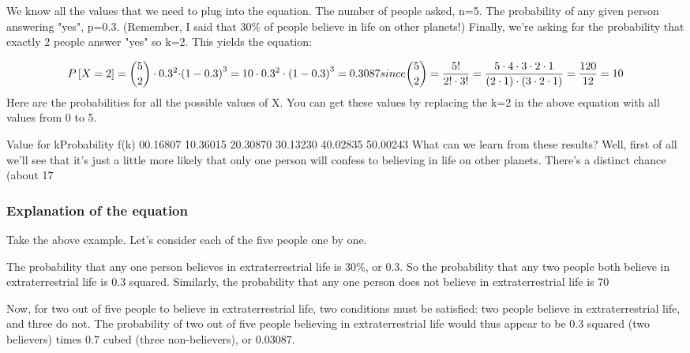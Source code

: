 We know all the values that we need to plug into the equation. The number of people asked, n=5. The probability of any given person answering "yes", p=0.3. (Remember, I said that 30\% of people believe in life on other planets!) Finally, we're asking for the probability that exactly 2 people answer "yes" so k=2. This yields the equation:

\[P \left[X = 2 \right] = {5 \choose 2} \cdot {{0.3^2 \cdot} {\left( 1 - 0.3 \right)^{3}}} = {10} \cdot {{0.3^2} \cdot {\left( 1-0.3 \right)^{3}}} = 0.3087 since {5 \choose 2}={5! \over 2! \cdot 3!}={5 \cdot 4 \cdot 3 \cdot 2 \cdot 1 \over (2 \cdot 1) \cdot (3 \cdot 2 \cdot 1)}={120 \over 12}=10\]
Here are the probabilities for all the possible values of X. You can get these values by replacing the k=2 in the above equation with all values from 0 to 5.



Value for kProbability f(k)
00.16807
10.36015
20.30870
30.13230
40.02835
50.00243
What can we learn from these results? Well, first of all we'll see that it's just a little more likely that only one person will confess to believing in life on other planets. There's a distinct chance (about 17%


\subsubsection{Explanation of the equation}
Take the above example. Let's consider each of the five people one by one.

The probability that any one person believes in extraterrestrial life is 30\%, or 0.3. So the probability that any two people both believe in extraterrestrial life is 0.3 squared. Similarly, the probability that any one person does not believe in extraterrestrial life is 70%

Now, for two out of five people to believe in extraterrestrial life, two conditions must be satisfied: two people believe in extraterrestrial life, and three do not. The probability of two out of five people believing in extraterrestrial life would thus appear to be 0.3 squared (two believers) times 0.7 cubed (three non-believers), or 0.03087.

